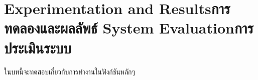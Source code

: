 \chapter{\ifproject%
\ifenglish Experimentation and Results\else การทดลองและผลลัพธ์\fi
\else%
\ifenglish System Evaluation\else การประเมินระบบ\fi
\fi}



ในบทนี้จะทดสอบเกี่ยวกับการทำงานในฟังก์ชันหลักๆ
